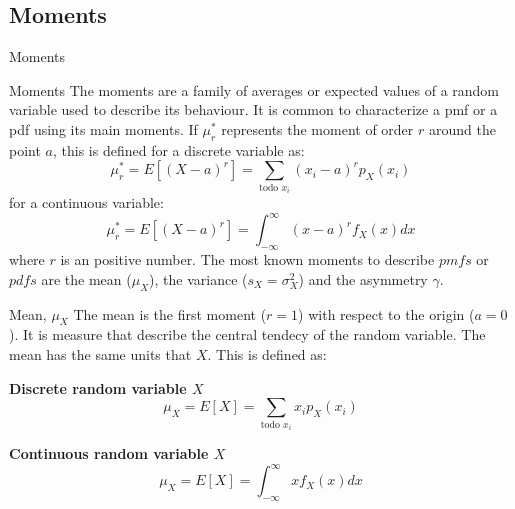 \documentclass[8pt]{beamer}
\renewcommand{\emph}[1]{\textcolor{myorange}{#1}}
\begin{document}
\subsection{Moments}
\begin{frame}{Moments}
    
    \begin{block}{Moments}
        The \alert{moments} are a family of averages or expected values of a random variable used to describe its behaviour. It is common to characterize a \emph{pmf} or a \emph{pdf} using its main moments. If $\mu_r^*$ represents the moment of order $r$ around the point $a$, this is defined  for a discrete variable as:
        \[
            \mu_r^* = E \left[(X - a)^r \right] = \sum_{\text{todo $x_i$}} (x_i - a)^r p_X (x_i) 
        \]
for a continuous variable:
        \[
            \mu_r^* = E \left[(X - a)^r \right] = \int_{-\infty}^{\infty} (x- a)^r f_X (x) dx
        \]
        where $r$ is an positive number.  The most known moments to describe $pmfs$ or $pdfs$ are the \alert{mean} ($\mu_X$), the \alert{variance} ($s_X = \sigma_X^2$) and the asymmetry  $\gamma$.
    \end{block}
    \vspace{-6pt}
    \begin{block}{Mean, $\mu_X$}
        The \alert{mean} is the first moment ($r = 1$) with respect to the origin ($a = 0$). It is measure that describe the central tendecy of the random variable. The \alert{mean} has the same units that $X$. This is defined as:
\begin{minipage}[t]{0.48\textwidth}
\centering
\textbf{Discrete random variable $X$}
\[
\mu_X = E \left[ X \right] = \sum_{\text{todo $x_i$}} x_i p_X (x_i)
\]
\end{minipage}
\hfill
\begin{minipage}[t]{0.48\textwidth}
\centering
\textbf{Continuous random variable $X$}
\[
\mu_X = E \left[ X \right] = \int_{-\infty}^{\infty} x f_X (x) dx
\]
\end{minipage}
\end{block}
\end{frame}
\end{document}
